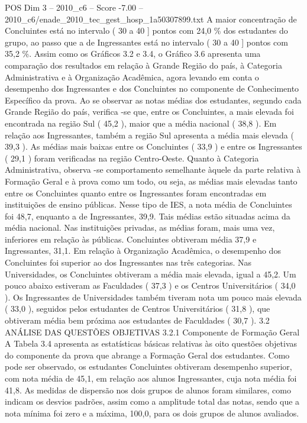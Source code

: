 \begin{textsample}{POS Dim 3 – 2010\_c6 – Score -7.00 – 2010\_c6/enade\_2010\_tec\_gest\_hosp\_1a50307899.txt}
A maior concentração de Concluintes está no intervalo ( 30 a 40 ] pontos com 24,0 \% dos estudantes do grupo, ao passo que a de Ingressantes está no intervalo ( 30 a 40 ] pontos com 35,2 \%.
Assim como os Gráficos 3.2 e 3.4, o Gráfico 3.6 apresenta uma comparação dos resultados em relação à Grande Região do país, à Categoria Administrativa e à Organização Acadêmica, agora levando em conta o desempenho dos Ingressantes e dos Concluintes no componente de Conhecimento Específico da prova.
Ao se observar as notas médias dos estudantes, segundo cada Grande Região do país, verifica -se que, entre os Concluintes, a mais elevada foi encontrada na região Sul ( 45,2 ), maior que a média nacional ( 38,8 ).
Em relação aos Ingressantes, também a região Sul apresenta a média mais elevada ( 39,3 ).
As médias mais baixas entre os Concluintes ( 33,9 ) e entre os Ingressantes ( 29,1 ) foram verificadas na região Centro-Oeste.
Quanto à Categoria Administrativa, observa -se comportamento semelhante àquele da parte relativa à Formação Geral e à prova como um todo, ou seja, as médias mais elevadas tanto entre os Concluintes quanto entre os Ingressantes foram encontradas em instituições de ensino públicas.
Nesse tipo de IES, a nota média de Concluintes foi 48,7, enquanto a de Ingressantes, 39,9.
Tais médias estão situadas acima da média nacional.
Nas instituições privadas, as médias foram, mais uma vez, inferiores em relação às públicas.
Concluintes obtiveram média 37,9 e Ingressantes, 31,1.
Em relação à Organização Acadêmica, o desempenho dos Concluintes foi superior ao dos Ingressantes nas três categorias.
Nas Universidades, os Concluintes obtiveram a média mais elevada, igual a 45,2.
Um pouco abaixo estiveram as Faculdades ( 37,3 ) e os Centros Universitários ( 34,0 ).
Os Ingressantes de Universidades também tiveram nota um pouco mais elevada ( 33,0 ), seguidos pelos estudantes de Centros Universitários ( 31,8 ), que obtiveram média bem próxima aos estudantes de Faculdades ( 30,7 ). 3.2 ANÁLISE DAS QUESTÕES OBJETIVAS 3.2.1 Componente de Formação Geral A Tabela 3.4 apresenta as estatísticas básicas relativas às oito questões objetivas do componente da prova que abrange a Formação Geral dos estudantes.
Como pode ser observado, os estudantes Concluintes obtiveram desempenho superior, com nota média de 45,1, em relação aos alunos Ingressantes, cuja nota média foi 41,8.
As medidas de dispersão nos dois grupos de alunos foram similares, como indicam os desvios padrões, assim como a amplitude total das notas, sendo que a nota mínima foi zero e a máxima, 100,0, para os dois grupos de alunos avaliados.

\end{textsample}
